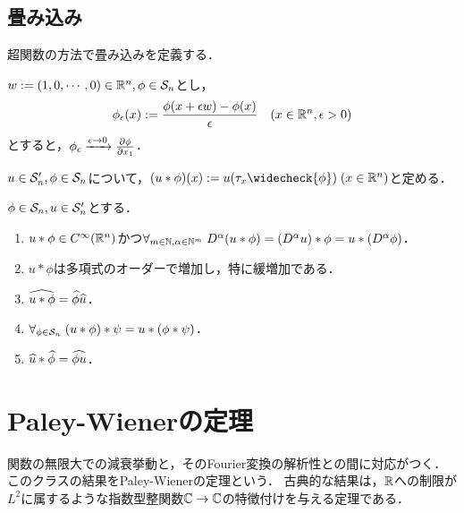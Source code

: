 \documentclass[uplatex,dvipdfmx]{jsreport}
\begin{document}
\subsection{畳み込み}

\begin{tcolorbox}[colframe=ForestGreen, colback=ForestGreen!10!white,breakable,colbacktitle=ForestGreen!40!white,coltitle=black,fonttitle=\bfseries\sffamily,
title=]
    超関数の方法で畳み込みを定義する．
\end{tcolorbox}

\begin{lemma}[Schwartz空間での収束の特徴付け]
    $w:=(1,0,\cdots,0)\in\R^n,\phi\in\S_n$とし，
    \[\phi_\ep(x):=\frac{\phi(x+\ep w)-\phi(x)}{\ep}\quad(x\in\R^n,\ep>0)\]
    とすると，$\phi_\ep\xrightarrow{\ep\to0}\pp{\phi}{x_1}$．
\end{lemma}

\begin{definition}
    $u\in\S'_n,\phi\in\S_n$について，$(u*\phi)(x):=u(\tau_x\widecheck{\phi})\;(x\in\R^n)$と定める．
\end{definition}

\begin{theorem}
    $\phi\in\S_n,u\in\S'_n$とする．
    \begin{enumerate}
        \item $u*\phi\in C^\infty(\R^n)$かつ$\forall_{m\in\N,\al\in\N^m}\;D^\al(u*\phi)=(D^\al u)*\phi=u*(D^\al\phi)$．
        \item $u*\phi$は多項式のオーダーで増加し，特に緩増加である．
        \item $\wh{u*\phi}=\wh{\phi}\wh{u}$．
        \item $\forall_{\phi\in\S_n}\;(u*\phi)*\psi=u*(\phi*\psi)$．
        \item $\wh{u}*\wh{\phi}=\wh{\phi u}$．
    \end{enumerate}
\end{theorem}

\section{Paley-Wienerの定理}

\begin{tcolorbox}[colframe=ForestGreen, colback=ForestGreen!10!white,breakable,colbacktitle=ForestGreen!40!white,coltitle=black,fonttitle=\bfseries\sffamily,
title=コンパクト台を持つ緩増加関数のFourier変換は整関数を定める]
    関数の無限大での減衰挙動と，そのFourier変換の解析性との間に対応がつく．このクラスの結果をPaley-Wienerの定理という．
    古典的な結果は，$\R$への制限が$L^2$に属するような指数型整関数$\C\to\C$の特徴付けを与える定理である．
\end{tcolorbox}
\end{document}
